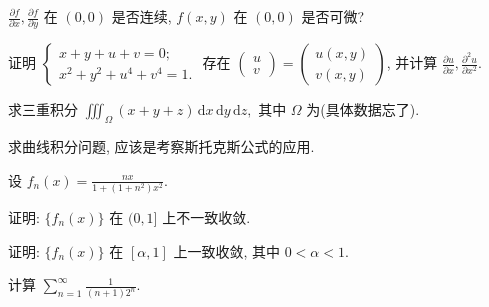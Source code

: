 $\frac{\partial f}{\partial x}, \frac{\partial f}{\partial y}$ 在 $(0,0)$ 是否连续, $f(x,y)$ 在 $(0,0)$ 是否可微?\par
\par{}
证明 $\left\{ \begin{array}{l} x + y + u + v = 0; \\ x^2 + y^2 + u^4 + v^4 = 1. \end{array} \right.$ 存在 $\left( \begin{array}{l} u \\ v \end{array} \right) = \left( \begin{array}{l} u(x, y) \\ v(x, y) \end{array} \right)$, 并计算 $\frac{\partial u}{\partial x}, \frac{\partial^2 u}{\partial x^2}$.\par
\par{}
求三重积分 $\iiint_{\Omega} (x + y + z) \, \mathrm{d}x \, \mathrm{d}y \, \mathrm{d}z,$ 其中 $\Omega$ 为(具体数据忘了).\par
\par{}
求曲线积分问题, 应该是考察斯托克斯公式的应用.\par
\par{}
设 $f_{n}(x) = \frac{nx}{1 + (1 + n^{2})x^{2}}$.\par
证明: $\{f_n(x)\}$ 在 $(0,1]$ 上不一致收敛.\par
证明: $\{f_n(x)\}$ 在 $[\alpha, 1]$ 上一致收敛, 其中 $0 < \alpha < 1$.\par
\par{}
计算 $\sum_{n=1}^{\infty} \frac{1}{(n+1)2^n}$.\par
